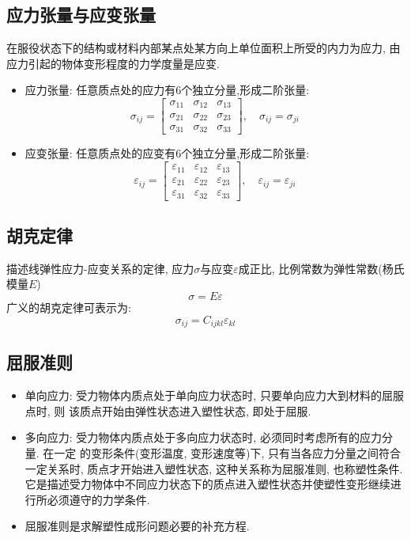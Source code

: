 \documentclass[a4paper,titlepage,twocolumn]{article}
\begin{document}
\subsection{应力张量与应变张量}
在服役状态下的结构或材料内部某点处某方向上单位面积上所受的内力为应力, 由应力引起的物体变形程度的力学度量是应变.
\begin{itemize}
\item 应力张量: 任意质点处的应力有6个独立分量,形成二阶张量:
\[
\sigma_{ij}=\left[\begin{array}{ccc}
\sigma_{11} & \sigma_{12} & \sigma_{13}\\
\sigma_{21} & \sigma_{22} & \sigma_{23}\\
\sigma_{31} & \sigma_{32} & \sigma_{33}
\end{array}\right],\quad\sigma_{ij}=\sigma_{ji}
\]

\item 应变张量: 任意质点处的应变有6个独立分量,形成二阶张量:
\[
\varepsilon_{ij}=\left[\begin{array}{ccc}
\varepsilon_{11} & \varepsilon_{12} & \varepsilon_{13}\\
\varepsilon_{21} & \varepsilon_{22} & \varepsilon_{23}\\
\varepsilon_{31} & \varepsilon_{32} & \varepsilon_{33}
\end{array}\right],\quad\varepsilon_{ij}=\varepsilon_{ji}
\]
\end{itemize}

\subsection{胡克定律}
描述线弹性应力-应变关系的定律, 应力$\sigma$与应变$\varepsilon$成正比, 比例常数为弹性常数(杨氏模量$E$)
\[
\sigma = E\varepsilon
\]
广义的胡克定律可表示为:
\[
\sigma_{ij} = C_{ijkl}\varepsilon_{kl}
\]

\subsection{屈服准则}
\begin{itemize}
\item 单向应力: 受力物体内质点处于单向应力状态时, 只要单向应力大到材料的屈服点时, 则
该质点开始由弹性状态进入塑性状态, 即处于屈服.
\item 多向应力: 受力物体内质点处于多向应力状态时, 必须同时考虑所有的应力分量. 在一定
的变形条件(变形温度, 变形速度等)下, 只有当各应力分量之间符合一定关系时, 质点才开始进入塑性状态, 这种关系称为屈服准则, 也称塑性条件. 它是描述受力物体中不同应力状态下的质点进入塑性状态并使塑性变形继续进行所必须遵守的力学条件.
\item 屈服准则是求解塑性成形问题必要的补充方程.
\end{itemize}
\end{document}
